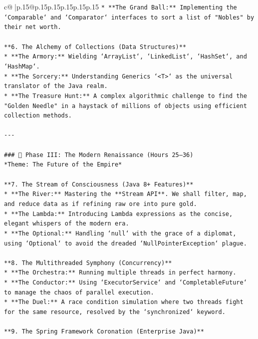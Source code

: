\documentclass{article}
\begin{document}
{\begin{supertabular}{c@{$\;$}|p{.15\linewidth}@{}p{.15\linewidth}p{.15\linewidth}p{.15\linewidth}p{.15\linewidth}p{.15\linewidth}}
{{{\texttt{*   **The Grand Ball:** Implementing the `Comparable` and `Comparator` interfaces to sort a list of "Nobles" by their net worth.} \\
\\ 
\texttt{**6. The Alchemy of Collections (Data Structures)**} \\
\texttt{*   **The Armory:** Wielding `ArrayList`, `LinkedList`, `HashSet`, and `HashMap`.} \\
\texttt{*   **The Sorcery:** Understanding Generics `<T>` as the universal translator of the Java realm.} \\
\texttt{*   **The Treasure Hunt:** A complex algorithmic challenge to find the "Golden Needle" in a haystack of millions of objects using efficient collection methods.} \\
\\ 
\texttt{{-}{-}{-}} \\
\\ 
\texttt{\#\#\# 🌙 Phase III: The Modern Renaissance (Hours 25–36)} \\
\texttt{*Theme: The Future of the Empire*} \\
\\ 
\texttt{**7. The Stream of Consciousness (Java 8+ Features)**} \\
\texttt{*   **The River:** Mastering the **Stream API**. We shall filter, map, and reduce data as if refining raw ore into pure gold.} \\
\texttt{*   **The Lambda:** Introducing Lambda expressions as the concise, elegant whispers of the modern era.} \\
\texttt{*   **The Optional:** Handling `null` with the grace of a diplomat, using `Optional` to avoid the dreaded `NullPointerException` plague.} \\
\\ 
\texttt{**8. The Multithreaded Symphony (Concurrency)**} \\
\texttt{*   **The Orchestra:** Running multiple threads in perfect harmony.} \\
\texttt{*   **The Conductor:** Using `ExecutorService` and `CompletableFuture` to manage the chaos of parallel execution.} \\
\texttt{*   **The Duel:** A race condition simulation where two threads fight for the same resource, resolved by the `synchronized` keyword.} \\
\\ 
\texttt{**9. The Spring Framework Coronation (Enterprise Java)**} \\
}}}
\end{supertabular}}
\end{document}
